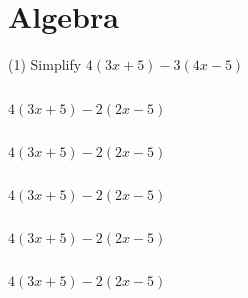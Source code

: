 \chapter{Algebra}


    \begin{tasks}[after-item-skip=2pt,after-skip=3pt, label-width=4ex](1)
         \task  Simplify $ 4(3x+5)-3(4x-5)$   \begin{envAnswer}[blankline=5]    $         $ \end{envAnswer}  
         \task  $ 4(3x+5)-2(2x-5)$       \begin{envAnswer}[blankline=4]    $         $ \end{envAnswer}  
         \task  $ 4(3x+5)-2(2x-5)$       \begin{envAnswer}[blankline=4]    $         $ \end{envAnswer}  
         \task  $ 4(3x+5)-2(2x-5)$       \begin{envAnswer}[blankline=4]    $         $ \end{envAnswer}  
         \task  $ 4(3x+5)-2(2x-5)$       \begin{envAnswer}[blankline=4]    $         $ \end{envAnswer}  
         \task  $ 4(3x+5)-2(2x-5)$       \begin{envAnswer}[blankline=4]    $         $ \end{envAnswer}  
    \end{tasks}

























